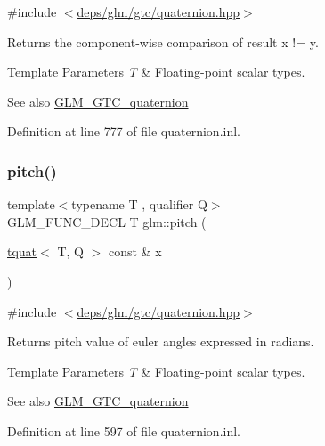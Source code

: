{\ttfamily \#include $<$\hyperlink{gtc_2quaternion_8hpp}{deps/glm/gtc/quaternion.\+hpp}$>$}

Returns the component-\/wise comparison of result x != y.


\begin{DoxyTemplParams}{Template Parameters}
{\em T} & Floating-\/point scalar types.\\
\hline
\end{DoxyTemplParams}
\begin{DoxySeeAlso}{See also}
\hyperlink{group__gtc__quaternion}{G\+L\+M\+\_\+\+G\+T\+C\+\_\+quaternion} 
\end{DoxySeeAlso}


Definition at line 777 of file quaternion.\+inl.

\mbox{\label{group__gtc__quaternion_ga9bd78e5fe153d07e39fb4c83e73dba73}} 
\subsubsection{\texorpdfstring{pitch()}{pitch()}}
{\footnotesize\ttfamily template$<$typename T , qualifier Q$>$ \\
G\+L\+M\+\_\+\+F\+U\+N\+C\+\_\+\+D\+E\+CL T glm\+::pitch (\begin{DoxyParamCaption}\item[{\hyperlink{structglm_1_1tquat}{tquat}$<$ T, Q $>$ const \&}]{x }\end{DoxyParamCaption})}



{\ttfamily \#include $<$\hyperlink{gtc_2quaternion_8hpp}{deps/glm/gtc/quaternion.\+hpp}$>$}

Returns pitch value of euler angles expressed in radians.


\begin{DoxyTemplParams}{Template Parameters}
{\em T} & Floating-\/point scalar types.\\
\hline
\end{DoxyTemplParams}
\begin{DoxySeeAlso}{See also}
\hyperlink{group__gtc__quaternion}{G\+L\+M\+\_\+\+G\+T\+C\+\_\+quaternion} 
\end{DoxySeeAlso}


Definition at line 597 of file quaternion.\+inl.


